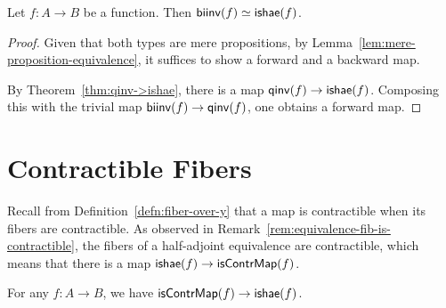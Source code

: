 \begin{cor}\fe
    Let\/ $f\colon A\to B$ be a function. Then\/ $\mathsf{biinv}(f)\simeq\mathsf{ishae}(f)$.
\end{cor}

\begin{proof}
    Given that both types are mere propositions, by Lemma~\ref{lem:mere-proposition-equivalence}, it suffices to show a forward and a backward map.

    By Theorem~\ref{thm:qinv->ishae}, there is a map $\mathsf{qinv}(f)\to\mathsf{ishae}(f)$. Composing this with the trivial map $\mathsf{biinv}(f)\to\mathsf{qinv}(f)$, one obtains a forward map.
    
\end{proof}

\section{Contractible Fibers}
Recall from Definition~\ref{defn:fiber-over-y} that a map is contractible when its fibers are contractible. As observed in Remark~\ref{rem:equivalence-fib-is-contractible}, the fibers of a half-adjoint equivalence are contractible, which means that there is a map $\mathsf{ishae}(f)\to\mathsf{isContrMap}(f)$.

\begin{thm}\label{thm:isContr->ishae}
    For any\/ $f\colon A\to B$, we have\/ $\mathsf{isContrMap}(f)\to\mathsf{ishae}(f)$.
\end{thm}

